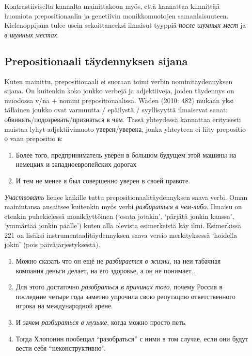\documentclass[]{scrartcl}
\providecommand{\tightlist}{%
  \setlength{\itemsep}{0pt}\setlength{\parskip}{0pt}}
\begin{document}
Kontrastiiviselta kannalta mainittakoon myös, että kannattaa kiinnittää
huomiota prepositionaalin ja genetiivin monikkomuotojen samanlaisuuteen.
Kielenoppijana tulee usein sekoittaneeksi ilmaisut tyyppiä \emph{после
шумных мест} ja \emph{в шумных местах}.

\subsection{Prepositionaali täydennyksen
sijana}\label{prepositionaali-tuxe4ydennyksen-sijana}

Kuten mainittu, prepositionaali ei suoraan toimi verbin
nominitäydennyksen sijana. On kuitenkin koko joukko verbejä ja
adjektiiveja, joiden täydennys on muodossa v/na + nomini
prepositionaalissa. Waden (2010: 482) mukaan yksi tällainen joukko ovat
varmuutta / epäilystä / syyllisyyttä ilmaisevat sanat:
обвинять/подозревать/признаться в чем. Tässä yhteydessä kannattaa
erityisesti muistaa lyhyt adjektiivimuoto уверен/уверена, jonka
yhteyteen ei liity prepositio о vaan prepositio в:

\begin{enumerate}
\def\labelenumi{(\arabic{enumi})}
\setcounter{enumi}{215}
\tightlist
\item
  Более того, предприниматель уверен в большом будущем этой машины на
  немецких и западноевропейских дорогах
\item
  И тем не менее я был совершенно уверен в своей правоте.
\end{enumerate}

\emph{Участвовать} lienee kaikille tuttu prepositionaalitäydennyksen
saava verbi. Oman mainintansa ansaitsee kuitenkin myös verbi
\emph{разбираться в чем-либо}. Ilmaisu on etenkin puhekielessä
monikäyttöinen (`osata jotakin', `pärjätä jonkin kanssa', `ymmärtää
jonkin päälle') kuten alla olevista esimerkeistä käy ilmi. Esimerkissä
221 on lisäksi instrumentaalitäydennyksen saava versio merkityksessä
`hoidella jokin' (pois päiväjärjestyksestä).

\begin{enumerate}
\def\labelenumi{(\arabic{enumi})}
\setcounter{enumi}{217}
\tightlist
\item
  Можно сказать что он ещё не \emph{разбирается в жизни}, на неи
  табачная компания деньги делает, на его здоровье, а он не понимает..
\item
  Для этого достаточно \emph{разобраться в причинах того}, почему Россия
  в последние четыре года заметно упрочила свою репутацию ответственного
  игрока на международной арене.
\item
  И зачем \emph{разбираться в музыке}, когда можно просто петь.
\item
  Тогда Хлопонин пообещал ``разобраться'' с ними в том случае, если они
  будут вести себя ``неконструктивно''.
\end{enumerate}
\end{document}
